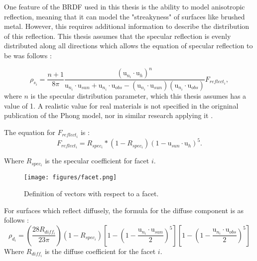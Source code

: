 One feature of the BRDF used in this thesis is the ability to model anisotropic reflection, meaning that it can model the "streakyness" of surfaces like brushed metal. However, this requires additional information to describe the distribution of this reflection. This thesis assumes that the specular reflection is evenly distributed along all directions which allows the equation of specular reflection to be was follows \cite{phong_brdf} \cite{SpaceObjectCharacterization}:

\begin{equation}\label{Phong_Specular}
\rho_{s_i} = \frac{n + 1}{8\pi}
\frac{(\bm{\mathrm{u}}_{n_i}\cdotp \bm{\mathrm{u}}_h)^n}
{\bm{\mathrm{u}}_{n_i}\cdotp \bm{\mathrm{u}}_{sun} + \bm{\mathrm{u}}_{n_i}\cdotp \bm{\mathrm{u}}_{obs} - (\bm{\mathrm{u}}_{n_i}\cdotp \bm{\mathrm{u}}_{sun})(\bm{\mathrm{u}}_{n_i}\cdotp \bm{\mathrm{u}}_{obs})}F_{reflect_i},
\end{equation}
where $n$ is the specular distribution parameter, which this thesis assumes has a value of 1. A realistic value for real materials is not specified in the origninal publication of the Phong model, nor in similar research applying it \cite{phong_brdf} \cite{SpaceObjectCharacterization} \cite{StateAndParameter} \cite{Kaasalainen_LCI}.

The equation for $F_{reflect_i}$ is \cite{phong_brdf}:
\begin{equation}
F_{reflect_i} = R_{spec_i}*(1 - R_{spec_i})(1 - \bm{\mathrm{u}}_{sun}\cdotp \bm{\mathrm{u}}_h)^5.
\end{equation}

Where $R_{spec_i}$ is the specular coefficient for facet $i$.

\begin{figure}[h!]
	\centering
	\texttt{[image: figures/facet.png]}
	\caption{Definition of vectors with respect to a facet.}
	\label{facet}
\end{figure}

For surfaces which reflect diffusely, the formula for the diffuse component is as follows \cite{phong_brdf} \cite{SpaceObjectCharacterization}:
\begin{equation}\label{Phong_Diffuse}
\rho_{d_i} = \left(\frac{28R_{diff_i}}{23\pi}\right)
(1 - R_{spec_i})
\left[1 - (1 - \frac{\bm{\mathrm{u}}_{n_i}\cdotp \bm{\mathrm{u}}_{sun}}{2})^5\right]
\left[1 - (1 - \frac{\bm{\mathrm{u}}_{n_i}\cdotp \bm{\mathrm{u}}_{obs}}{2})^5\right]
\end{equation}
Where $R_{diff_i}$ is the diffuse coefficient for the facet $i$.

